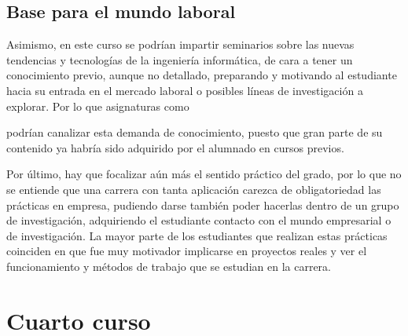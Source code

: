 \subsection{Base para el mundo laboral}
Asimismo, en este curso se podrían impartir seminarios sobre las nuevas tendencias y 
tecnologías de la ingeniería informática, de cara a tener un conocimiento previo, aunque 
no detallado, preparando y motivando al estudiante hacia su entrada en el mercado laboral o 
posibles líneas de investigación a explorar. Por lo que asignaturas como 
\subject{Tecnologías Específicas de la Ingeniería Informática (TEII)} podrían canalizar 
esta demanda de conocimiento, puesto que gran parte de su contenido ya habría sido adquirido 
por el alumnado en cursos previos.

Por último, hay que focalizar aún más el sentido práctico del grado, por lo que no se 
entiende que una carrera con tanta aplicación carezca de obligatoriedad las prácticas en 
empresa, pudiendo darse también poder hacerlas dentro de un grupo de investigación, 
adquiriendo el estudiante contacto con el mundo empresarial o de investigación. La mayor parte 
de los estudiantes que realizan estas prácticas coinciden en que fue muy motivador implicarse en 
proyectos reales y ver el funcionamiento y métodos de trabajo que se estudian en la carrera.
\section{Cuarto curso}

